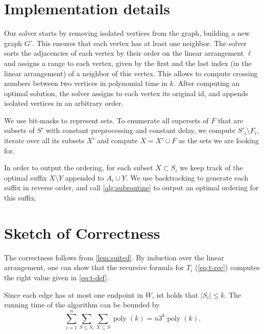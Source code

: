 \documentclass[a4paper,UKenglish,cleveref, autoref, thm-restate]{lipics-v2021}
\newcommand{\layertwo}{\ensuremath{W}}
\begin{document}
\section{Implementation details}

Our solver starts by removing isolated vertices from the graph, building a new graph $G'$. This ensures that each vertex has at least one neighbor. The solver sorts the adjacencies of each vertex by their order on the linear arrangement $\ell$ and assigns a range to each vertex, given by the first and the last index (in the linear arrangement) of a neighbor of this vertex. This allows to compute crossing numbers between two vertices in polynomial time in $k$.
After computing an optimal solution, the solver assigns to each vertex its original id, and appends isolated vertices in an arbitrary order.

We use bit-masks to represent sets. To enumerate all supersets of $F$ that are subsets of $S'$ with constant preprocessing and constant delay, we compute $S'_i\setminus F_i$, iterate over all its subsets $X'$ and compute $X = X' \cup F$ as the sets we are looking for.

In order to output the ordering, for each subset $X\subset S_i$ we keep track of the optimal suffix $X\setminus Y$ appended to $A_i \cup Y$. We use backtracking to generate each suffix in reverse order, and call \cref{alg:subroutine} to output an optimal ordering for this suffix.

\section{Sketch of Correctness}
The correctness follows from \cref{lem:suited}. By induction over the linear arrangement, one can show that the recursive formula for $T_i$ (\cref{eq:t-rec}) computes the right value given in \cref{eq:t-def}.

Since each edge has at most one endpoint in $\layertwo$, ist holds that $|S_i|\leq k$. The running time of the algorithm can be bounded by
\[
\sum_{i=1}^{n}\sum\limits_{S\subseteq S_i}\sum\limits_{X\subseteq S} \operatorname{poly}(k) = n3^k\operatorname{poly}(k).
\]

\end{document}
